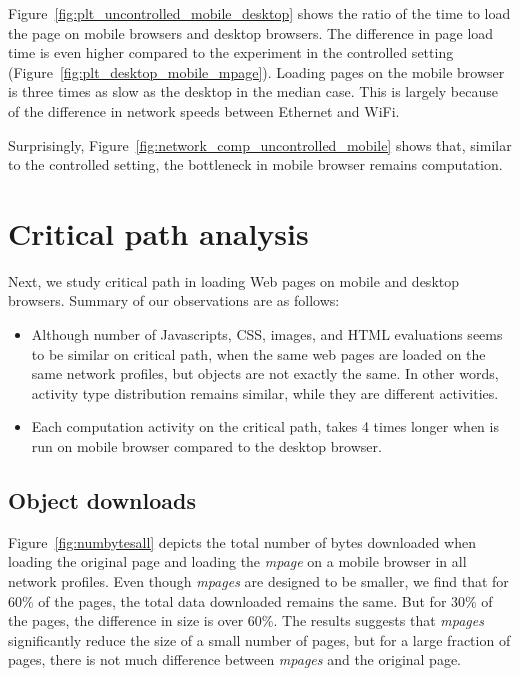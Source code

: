 \noindent Figure~\ref{fig:plt_uncontrolled_mobile_desktop} shows the ratio of the time to load the page on mobile browsers and desktop browsers. The difference in page load time is even higher compared to the experiment in the controlled setting (Figure~\ref{fig:plt_desktop_mobile_mpage}). Loading pages on the mobile browser is three times as slow as the desktop in the median case. This is largely because of the difference in network speeds between Ethernet and WiFi.

\noindent Surprisingly, Figure~\ref{fig:network_comp_uncontrolled_mobile} shows that, similar to the controlled setting, the bottleneck in mobile browser remains computation.
%
%
\section{Critical path analysis}

Next, we study critical path in loading Web pages on mobile and desktop browsers. Summary of our observations are as follows:
\begin{itemize} 

\item Although number of Javascripts, CSS, images, and HTML evaluations seems to be similar on critical path, when the same web pages are loaded on the same network profiles, but objects are not exactly the same. In other words, activity type distribution remains similar, while they are different activities.

\item Each computation activity on the critical path, takes 4 times longer when is run on mobile browser compared to the desktop browser.

\end{itemize}
\subsection{Object downloads}

Figure~\ref{fig:numbytesall} depicts the total number of bytes downloaded when loading the original page and loading the {\em mpage} on a mobile browser in all network profiles. Even though {\em mpages} are designed to be smaller, we find that for 60\% of the pages, the total data downloaded remains the same. But for 30\% of the pages, the difference in size is over 60\%. The results suggests that {\em mpages} significantly reduce the size of a small number of pages, but for a large fraction of pages, there is not much difference between {\em mpages} and the original page.

